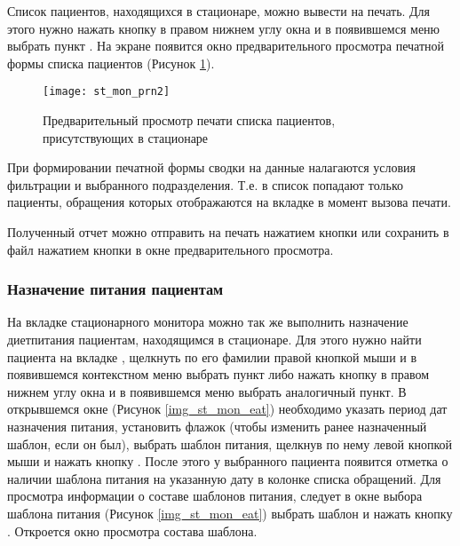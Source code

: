 Список пациентов, находящихся в стационаре, можно вывести на печать. Для этого нужно нажать кнопку  в правом нижнем углу окна и в появившемся меню выбрать пункт . На экране появится окно предварительного просмотра печатной формы списка пациентов (Рисунок \ref{img_st_mon_prn2}).

\begin{figure}[ht]\centering
   \texttt{[image: st\_mon\_prn2]}
   \caption{Предварительный просмотр печати списка пациентов, присутствующих в стационаре}
   \label{img_st_mon_prn2}
\end{figure}
 
\begin{vnim}
 При формировании печатной формы сводки на данные налагаются условия фильтрации и выбранного подразделения. Т.е. в список попадают только пациенты, обращения которых отображаются на вкладке  в момент вызова печати.
\end{vnim}
 
Полученный отчет можно отправить на печать нажатием кнопки   или сохранить в файл нажатием кнопки  в окне предварительного просмотра.

\subsubsection{Назначение питания пациентам}

На вкладке  стационарного монитора можно так же выполнить назначение диетпитания пациентам, находящимся в стационаре. Для этого нужно найти пациента на вкладке , щелкнуть по его фамилии правой кнопкой мыши и в появившемся контекстном меню выбрать пункт  либо нажать кнопку  в правом нижнем углу окна и в появившемся меню выбрать аналогичный пункт. В открывшемся окне (Рисунок \ref{img_st_mon_eat}) необходимо указать период дат назначения питания, установить флажок  (чтобы изменить ранее назначенный шаблон, если он был), выбрать шаблон питания, щелкнув по нему левой кнопкой мыши и нажать кнопку . После этого у выбранного пациента появится отметка о наличии шаблона питания на указанную дату в колонке  списка обращений. Для просмотра информации о составе шаблонов питания, следует в окне выбора шаблона питания (Рисунок \ref{img_st_mon_eat}) выбрать шаблон и нажать кнопку . Откроется окно просмотра состава шаблона.

